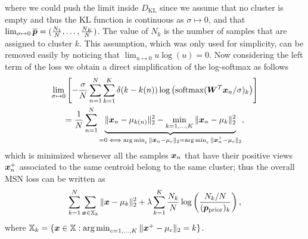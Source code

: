 \documentclass{article} %
\begin{document}
where we could push the limit inside $D_{\text{KL}}$ since we assume that no cluster is empty and thus the KL function is continuous as $\sigma\mapsto 0$, and that $\lim_{\sigma \mapsto 0}\overline{{\bm{p}}}=(\frac{N_1}{N},\dots,\frac{N_K}{N})$. The value of $N_k$ is the number of samples that are assigned to cluster $k$. This assumption, which was only used for simplicity, can be removed easily by noticing that $\lim_{u\mapsto 0} u\log(u)=0$. Now considering the left term of the loss we obtain a direct simplification of the log-softmax as follows
\begin{gather*}
    \lim_{\sigma \mapsto 0 }\left[-\frac{\sigma}{N}\sum_{n=1}^{N}\sum_{k=1}^{K}\delta(k-k(n))\log\left(\text{softmax}({\bm{W}}^T{\bm{x}}_n/\sigma)_k\right)\right]\\=\frac{1}{N}\sum_{n=1}^{N}\underbrace{\|{\bm{x}}_n-\mu_{k(n)} \|_2^2-\min_{k=1,\dots,K}\|{\bm{x}}_n-\mu_{k} \|_2^2}_{=0 \iff \operatorname*{arg\,min}_c \|{\bm{x}}_n-\mu_c\|_2=\operatorname*{arg\,min}_c\|{\bm{x}}_n^+-\mu_c\|_2},
\end{gather*}
which is minimized whenever all the samples ${\bm{x}}_n$ that have their positive views ${\bm{x}}_n^+$ associated to the same centroid belong to the same cluster; thus the overall MSN loss can be written as
\begin{align*}
    \sum_{k=1}^{N}\sum_{{\bm{x}} \in {\mathbb{X}}_k}\|{\bm{x}}-\mu_k\|_2^2+\lambda \sum_{k=1}^{K} \frac{N_k}{N}\log\left(\frac{N_k/N}{({\bm{p}}_{\rm prior})_k}\right),
\end{align*}
where ${\mathbb{X}}_k = \{{\bm{x}} \in {\mathbb{X}} : \operatorname*{arg\,min}_{c=1,\dots,K}\|{\bm{x}}^+-\mu_c\|_2=k \}$.
\end{document}
